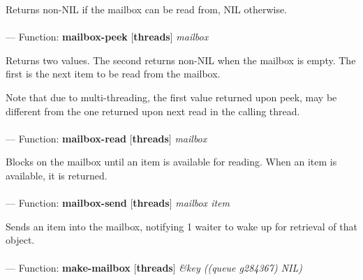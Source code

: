 \begin{adjustwidth}{5em}{5em}
Returns non-NIL if the mailbox can be read from, NIL otherwise.
\end{adjustwidth}

\paragraph{}
\label{THREADS:MAILBOX-PEEK}
--- Function: \textbf{mailbox-peek} [\textbf{threads}] \textit{mailbox}

\begin{adjustwidth}{5em}{5em}
Returns two values. The second returns non-NIL when the mailbox
is empty. The first is the next item to be read from the mailbox.

Note that due to multi-threading, the first value returned upon
peek, may be different from the one returned upon next read in the
calling thread.
\end{adjustwidth}

\paragraph{}
\label{THREADS:MAILBOX-READ}
--- Function: \textbf{mailbox-read} [\textbf{threads}] \textit{mailbox}

\begin{adjustwidth}{5em}{5em}
Blocks on the mailbox until an item is available for reading.
When an item is available, it is returned.
\end{adjustwidth}

\paragraph{}
\label{THREADS:MAILBOX-SEND}
--- Function: \textbf{mailbox-send} [\textbf{threads}] \textit{mailbox item}

\begin{adjustwidth}{5em}{5em}
Sends an item into the mailbox, notifying 1 waiter
to wake up for retrieval of that object.
\end{adjustwidth}

\paragraph{}
\label{THREADS:MAKE-MAILBOX}
--- Function: \textbf{make-mailbox} [\textbf{threads}] \textit{\&key ((queue g284367) NIL)}

